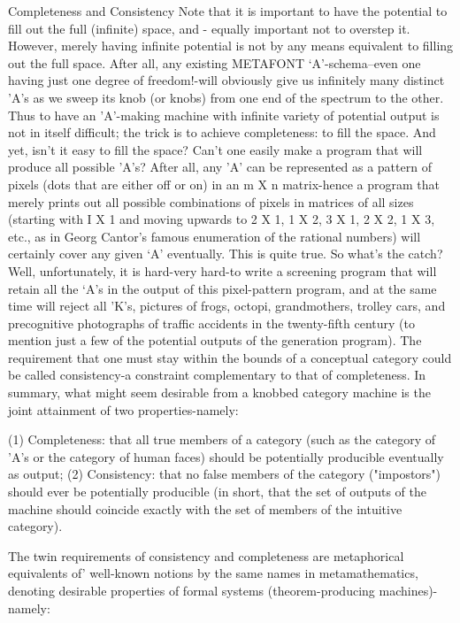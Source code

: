                            Completeness and Consistency
    Note that it is important to have the potential to fill out the full (infinite) space, and -
equally important not to overstep it. However, merely having infinite potential is not by
any means equivalent to filling out the full space. After all, any existing METAFONT
`A'-schema--even one having just one degree of freedom!-will obviously give us
infinitely many distinct 'A's as we sweep its knob (or knobs) from one end of the
spectrum to the other. Thus to have an 'A'-making machine with infinite variety of
potential output is not in itself difficult; the trick is to achieve completeness: to fill the
space.
    And yet, isn't it easy to fill the space? Can't one easily make a program that will
produce all possible 'A's? After all, any 'A' can be represented as a pattern of pixels (dots
that are either off or on) in an m X n matrix-hence a program that merely prints out all
possible combinations of pixels in matrices of all sizes (starting with I X 1 and moving
upwards to 2 X 1, 1 X 2, 3 X 1, 2 X 2, 1 X 3, etc., as in Georg Cantor's famous
enumeration of the rational numbers) will certainly cover any given `A' eventually. This
is quite true. So what's the catch?
    Well, unfortunately, it is hard-very hard-to write a screening program that will retain
all the `A's in the output of this pixel-pattern program, and at the same time will reject all
'K's, pictures of frogs, octopi, grandmothers, trolley cars, and precognitive photographs of
traffic accidents in the twenty-fifth century (to mention just a few of the potential outputs
of the generation program). The requirement that one must stay within the bounds of a
conceptual category could be called consistency-a constraint complementary to that of
completeness.
    In summary, what might seem desirable from a knobbed category machine is the joint
attainment of two properties-namely:

   (1) Completeness: that all true members of a category (such as the category of 'A's
      or the category of human faces) should be potentially producible eventually as
      output;
   (2) Consistency: that no false members of the category ("impostors") should ever be
      potentially producible (in short, that the set of outputs of the machine should
      coincide exactly with the set of members of the intuitive category).

   The twin requirements of consistency and completeness are metaphorical equivalents
of' well-known notions by the same names in metamathematics, denoting desirable
properties of formal systems (theorem-producing machines)-namely:

